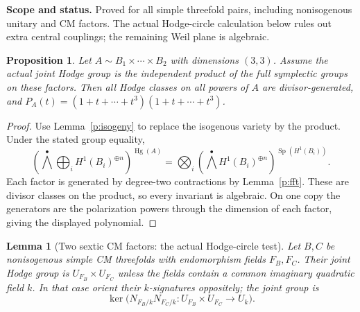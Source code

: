 \documentclass[10pt,reqno]{article}
\theoremstyle{emphasizedplain}
\newtheorem{lemma}[theorem]{Lemma}
\newtheorem{proposition}[theorem]{Proposition}
\theoremstyle{emphasizeddefinition}
\theoremstyle{emphasizeddefinition}
\DeclareMathOperator{\Hg}{Hg}
\DeclareMathOperator{\Sp}{Sp}
\newcommand{\status}[1]{%
  \par\nobreak\smallskip\noindent
  {\setlength{\fboxsep}{7pt}%
   \colorbox{ScopeBackground}{%
    \parbox{\dimexpr\linewidth-2\fboxsep\relax}{%
     \small\textbf{\textcolor{HeadingInk}{Scope and status.}} #1}}}%
  \par\nobreak\medskip}
\renewcommand{\small}{\fontsize{8.4}{10}\selectfont}
\begin{document}
\status{Proved for all simple threefold pairs, including nonisogenous unitary
and CM factors. The actual Hodge-circle calculation below rules out
extra central couplings; the remaining Weil plane is algebraic.}
\begin{proposition}
Let $A\sim B_1\times\cdots\times B_{2}$ with dimensions
$(3,3)$. Assume the actual joint Hodge group is the
independent product of the full symplectic groups on these factors.
Then all Hodge classes on all powers of $A$ are divisor-generated,
and $P_A(t)=(1+t+\cdots+t^{3})(1+t+\cdots+t^{3})$.
\end{proposition}
\begin{proof}
Use Lemma~\ref{p:isogeny} to replace the isogenous variety by the product.
Under the stated group equality,
\[
 \left(\bigwedge^\bullet\bigoplus_i H^1(B_i)^{\oplus n}\right)^{\Hg(A)}
 =\bigotimes_i\left(\bigwedge^\bullet H^1(B_i)^{\oplus n}\right)^{\Sp(H^1(B_i))}.
\]
Each factor is generated by degree-two contractions by Lemma~\ref{p:fft}.
These are divisor classes on the product, so every invariant is algebraic.
On one copy the generators are the polarization powers through the
dimension of each factor, giving the displayed polynomial.
\end{proof}
\begin{lemma}[Two sextic CM factors: the actual Hodge-circle test]
\label{p:CMthreepair}
Let $B,C$ be nonisogenous simple CM threefolds with endomorphism fields
$F_B,F_C$. Their joint Hodge group is $U_{F_B}\times U_{F_C}$ unless
the fields contain a common imaginary quadratic field $k$.
In that case orient their $k$-signatures oppositely; the joint group is
\[
 \ker\bigl(N_{F_B/k}N_{F_C/k}:U_{F_B}\times U_{F_C}\longrightarrow U_k\bigr).
\]
\end{lemma}
\end{document}
